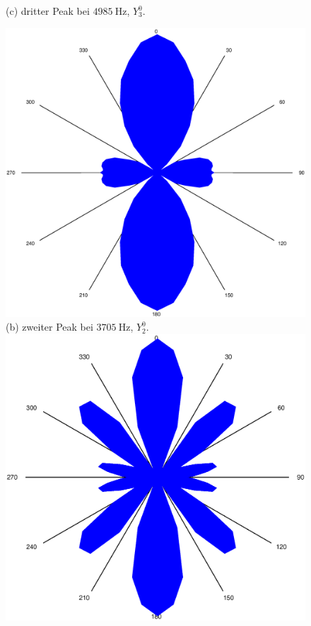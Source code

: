 \begin{figure}
\begin{minipage}{0.45\textwidth}
%
(c) dritter Peak bei $\SI{4985}{\hertz}$, $Y_3^0$.
\end{minipage}
\begin{minipage}{0.45\textwidth}
\centering
\includegraphics[width=\linewidth,keepaspectratio]{FP-V23data/2.3_3704.961Hz.eps}
%
(b) zweiter Peak bei $\SI{3705}{\hertz}$, $Y_2^0$.
\includegraphics[width=\linewidth,keepaspectratio]{FP-V23data/2.3_6230.866Hz.eps}

\end{minipage}
\end{figure}
